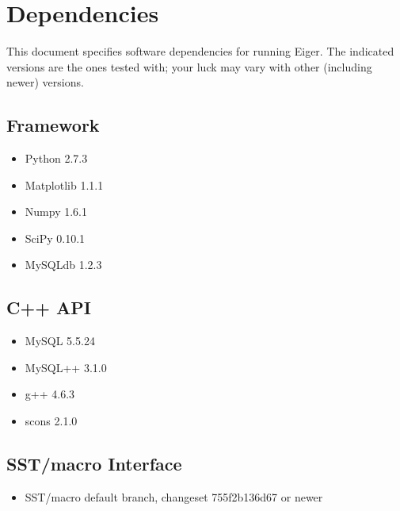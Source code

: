 \section{Dependencies}
\label{sec:dep}
This document specifies software dependencies for running Eiger. 
The indicated versions are the ones tested with; your luck may 
vary with other (including newer) versions.

\subsection{Framework}
\begin{itemize}
\item Python 2.7.3
\item Matplotlib 1.1.1
\item Numpy 1.6.1
\item SciPy 0.10.1
\item MySQLdb 1.2.3
\end{itemize}

\subsection{C++ API}
\begin{itemize}
\item MySQL 5.5.24
\item MySQL++ 3.1.0
\item g++ 4.6.3
\item scons 2.1.0
\end{itemize}

\subsection{SST/macro Interface}
\begin{itemize}
\item SST/macro default branch, changeset 755f2b136d67 or newer
\end{itemize}
